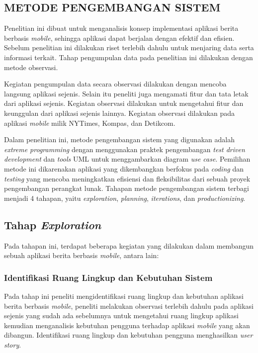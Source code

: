 \begin{spacing}{2}
\chapter{METODE PENGEMBANGAN SISTEM}

  Penelitian ini dibuat untuk menganalisis konsep implementasi aplikasi berita berbasis \emph{mobile}, sehingga aplikasi dapat berjalan dengan efektif dan efisien. Sebelum penelitian ini dilakukan riset terlebih dahulu untuk menjaring data serta informasi terkait. Tahap pengumpulan data pada penelitian ini dilakukan dengan metode observasi.

  Kegiatan pengumpulan data secara observasi dilakukan dengan mencoba langsung aplikasi sejenis. Selain itu peneliti juga mengamati fitur dan tata letak dari aplikasi sejenis. Kegiatan observasi dilakukan untuk mengetahui fitur dan keunggulan dari aplikasi sejenis lainnya. Kegiatan observasi dilakukan pada aplikasi \emph{mobile} milik NYTimes, Kompas, dan Detikcom.

  Dalam penelitian ini, metode pengembangan sistem yang digunakan adalah \emph{extreme programming} dengan menggunakan praktek pengembangan \emph{test driven development} dan \emph{tools} UML untuk menggambarkan diagram \emph{use case}. Pemilihan metode ini dikarenakan aplikasi yang dikembangkan berfokus pada \emph{coding} dan \emph{testing} yang mencoba meningkatkan efisiensi dan fleksibilitas dari sebuah proyek pengembangan perangkat lunak. Tahapan metode pengembangan sistem terbagi menjadi 4 tahapan, yaitu \emph{exploration}, \emph{planning}, \emph{iterations}, dan \emph{productionizing}.

  \section{Tahap \emph{Exploration}}
    Pada tahapan ini, terdapat beberapa kegiatan yang dilakukan dalam membangun sebuah aplikasi berita berbasis \emph{mobile}, antara lain:

    \subsection{Identifikasi Ruang Lingkup dan Kebutuhan Sistem}
      Pada tahap ini peneliti mengidentifikasi ruang lingkup dan kebutuhan aplikasi berita berbasis \emph{mobile}, peneliti melakukan observasi terlebih dahulu pada aplikasi sejenis yang sudah ada sebelumnya untuk mengetahui ruang lingkup aplikasi kemudian menganalisis kebutuhan pengguna terhadap aplikasi \emph{mobile} yang akan dibangun. Identifikasi ruang lingkup dan kebutuhan pengguna menghasilkan \emph{user story}.


\end{spacing}

